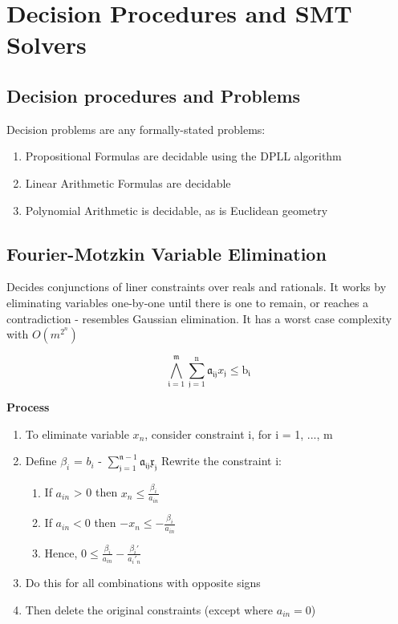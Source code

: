 \documentclass{article}
\begin{document}
\section{Decision Procedures and SMT Solvers}
\subsection{Decision procedures and Problems}
Decision problems are any formally-stated problems:
\begin{enumerate}
    \item Propositional Formulas are decidable using the DPLL algorithm
    \item Linear Arithmetic Formulas are decidable
    \item Polynomial Arithmetic is decidable, as is Euclidean geometry
\end{enumerate}

\subsection{Fourier-Motzkin Variable Elimination}
Decides conjunctions of liner constraints over reals and rationals. It works by eliminating variables one-by-one until there is one to remain, or reaches a contradiction - resembles Gaussian elimination. It has a worst case complexity with $O(m^{2^{n}})$

$$\bigwedge_{\mathfrak{i}=1}^{\mathfrak{m}} \sum_{\mathfrak{j}=1}^{\mathrm{n}} \mathfrak{a}_{\mathfrak{i j}} x_{\mathfrak{j}} \leq \mathrm{b}_{\mathfrak{i}}$$

\bigskip
\noindent
\textbf{Process}
\begin{enumerate}
    \item To eliminate variable $x_{n}$, consider constraint i, for i = 1, ..., m
    \item Define $\beta _{i}$ = $b_{i}$ - $\sum_{\mathfrak{j}=1}^{\mathfrak{n}-1} \mathfrak{a}_{\mathfrak{i} \mathfrak{j}} \mathfrak{x}_{\mathfrak{j}}$ Rewrite the constraint i:
    \begin{enumerate}
        \item If $a_{in}$ > 0 then $x_{n} \leq \frac{\beta _{i}}{a_{in}}$
        
        \item If $a_{in} < 0$ then $-x_{n} \leq -\frac{\beta _{i}}{a_{in}}$
        
        \item Hence, $0 \leq \frac{\beta_{i}}{a_{i n}}-\frac{\beta_{i} \prime}{a_{i} \prime_{n}}$
    \end{enumerate}
    
    \item Do this for all combinations with opposite signs
    
    \item Then delete the original constraints (except where $a_{in} = 0$)
\end{enumerate}
\end{document}
